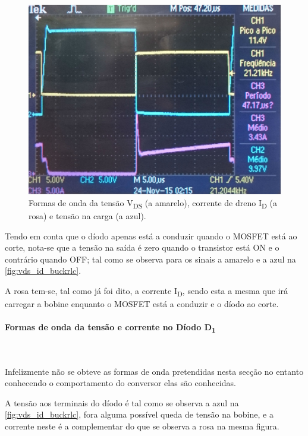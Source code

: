 \documentclass[a4paper,11pt]{article}
\numberwithin{equation}{section}
\begin{document}
\begin{figure}[H]
	\centering
	\includegraphics[keepaspectratio=true, scale=0.17]{img/figs/vds_id_buckrlc}
	\caption{Formas de onda da tensão V\textsubscript{DS} (a amarelo), corrente de dreno I\textsubscript{D} (a rosa) e tensão na carga (a azul).}
	\label{fig:vds_id_buckrlc}
	\vspace{-0.8em}
\end{figure} 

Tendo em conta que o díodo apenas está a conduzir quando o MOSFET está ao corte, nota-se que a tensão na saída é zero quando o transistor está ON e o contrário quando OFF; tal como se observa para os sinais a amarelo e a azul na \autoref{fig:vds_id_buckrlc}.

A rosa tem-se, tal como já foi dito, a corrente I\textsubscript{D}, sendo esta a mesma que irá carregar a bobine enquanto o MOSFET está a conduzir e o díodo ao corte.

\paragraph{Formas de onda da tensão e corrente no Díodo D\textsubscript{1}}\mbox{}\

Infelizmente não se obteve as formas de onda pretendidas nesta secção no entanto conhecendo o comportamento do conversor elas são conhecidas.

A tensão aos terminais do díodo é tal como se observa a azul na \autoref{fig:vds_id_buckrlc}, fora alguma possível queda de tensão na bobine, e a corrente neste é a complementar do que se observa a rosa na mesma figura.
\end{document}
